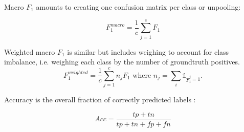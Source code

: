 Macro \(F_1\) \cite{threshForF1} amounts to creating one confusion matrix per class or unpooling:

$$F_1^{macro} = \frac{1}{c} \sum_{j=1}^c F_1$$


Weighted macro \(F_1\)  is similar but includes weighing to account for class imbalance, i.e. weighing each class by the number of groundtruth positives.
\begin{equation}
F_1^{weighted} = \frac{1}{c} \sum_{j=1}^c n_j F_1 \text{ where } n_j = \sum_i \mathds{1}_{\mathbf{y_i^j} = 1}.
\end{equation}


Accuracy is the overall fraction of correctly predicted labels \cite{threshForF1}:

$$
A c c=\frac{t p+t n}{t p+t n+f p+f n}
$$




 \cite{lossComp}


